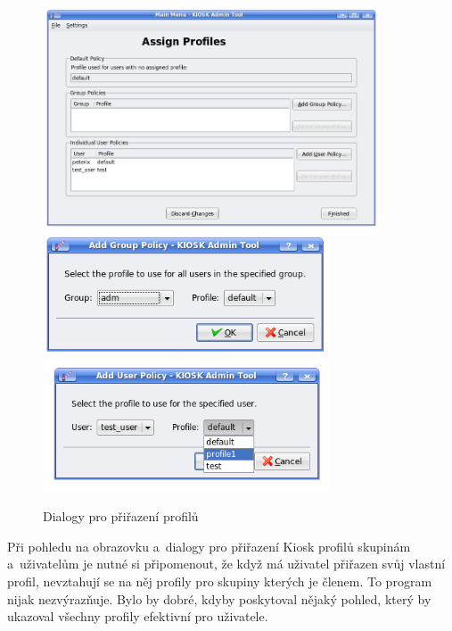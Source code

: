 \begin{figure}[h]
    \centering
    \includegraphics[width=10cm]{obrazky/KioskToolKDE3/prirazeni_profilu.png}
    \includegraphics[width=8.5cm]{obrazky/KioskToolKDE3/prirazeni_profilu_skupine.png}
    \includegraphics[width=8.5cm]{obrazky/KioskToolKDE3/prirazeni_profilu_uzivateli.png}
    \caption{Dialogy pro přiřazení profilů}
    \label{fig:kt3_prirazeni}
\end{figure}
Při pohledu na obrazovku a~dialogy pro přiřazení Kiosk profilů skupinám a~uživatelům je nutné si připomenout, že když má uživatel přiřazen svůj vlastní profil, nevztahují se na něj profily pro skupiny kterých je členem. To program nijak nezvýrazňuje. Bylo by dobré, kdyby poskytoval nějaký pohled, který by ukazoval všechny profily efektivní pro uživatele.

